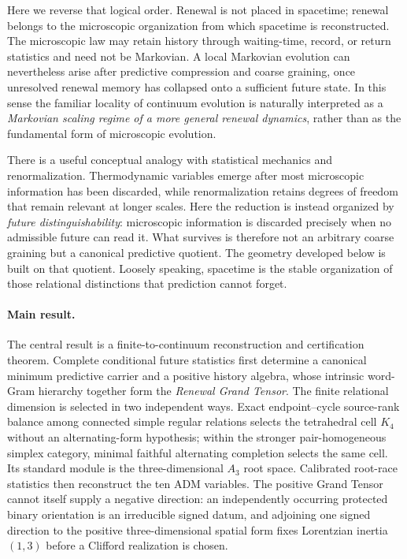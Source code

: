 \documentclass[11pt]{article}
\theoremstyle{definition}
\theoremstyle{remark}
\begin{document}
Here we reverse that logical order.  Renewal is not placed in spacetime;
renewal belongs to the microscopic organization from which spacetime is
reconstructed.  The microscopic law may retain history through waiting-time,
record, or return statistics and need not be Markovian.  A local Markovian
evolution can nevertheless arise after predictive compression and coarse
graining, once unresolved renewal memory has collapsed onto a sufficient
future state.  In this sense the familiar locality of continuum evolution is
naturally interpreted as a \emph{Markovian scaling regime of a more general
renewal dynamics}, rather than as the fundamental form of microscopic
evolution.

There is a useful conceptual analogy with statistical mechanics and
renormalization.  Thermodynamic variables emerge after most microscopic
information has been discarded, while renormalization retains degrees of
freedom that remain relevant at longer scales.  Here the reduction is instead
organized by \emph{future distinguishability}: microscopic information is
discarded precisely when no admissible future can read it.  What survives is
therefore not an arbitrary coarse graining but a canonical predictive quotient.
The geometry developed below is built on that quotient.  Loosely speaking,
spacetime is the stable organization of those relational distinctions that
prediction cannot forget.

\paragraph{Main result.}
The central result is a finite-to-continuum reconstruction and certification
theorem.  Complete conditional future statistics first determine a canonical
minimum predictive carrier and a positive history algebra, whose intrinsic
word-Gram hierarchy together form the \emph{Renewal Grand Tensor}.  The finite relational dimension is selected in two independent ways.  Exact
endpoint--cycle source-rank balance among connected simple regular relations
selects the tetrahedral cell $K_4$ without an alternating-form hypothesis;
within the stronger pair-homogeneous simplex category, minimal faithful
alternating completion selects the same cell.  Its standard module is the
three-dimensional $A_3$ root space.  Calibrated root-race statistics then
reconstruct the ten ADM variables.  The positive Grand Tensor cannot itself
supply a negative direction: an independently occurring protected binary
orientation is an irreducible signed datum, and adjoining one signed direction
to the positive three-dimensional spatial form fixes Lorentzian inertia
$(1,3)$ before a Clifford realization is chosen.
\end{document}
